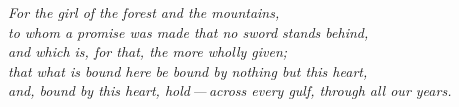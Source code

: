 \begin{flushright}
\itshape\color{rose}
For the girl of the forest and the mountains,\\
to whom a promise was made that no sword stands behind,\\
and which is, for that, the more wholly given;\\
that what is bound here be bound by nothing but this heart,\\
and, bound by this heart, hold\,---\,across every gulf, through all our years.
\end{flushright}

\bigskip
\begin{center}
\itshape\color{rose}
\end{center}
